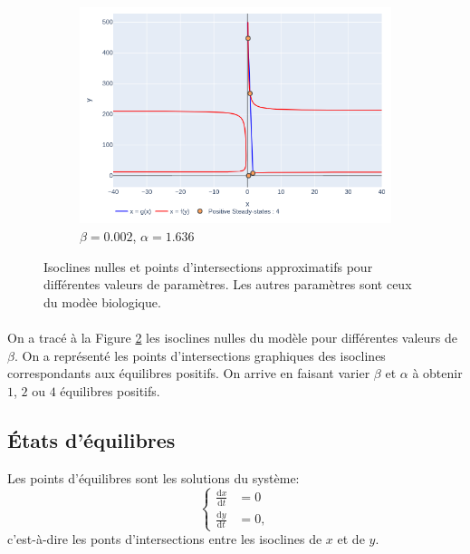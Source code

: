\documentclass[12pt]{article}
\newcommand{\deriv}{\mathrm{d}}
\newcommand{\dt}[1]{\frac{\deriv #1}{\deriv t}}
\begin{document}
\begin{figure}[!ht]
\begin{subfigure}[b]{0.49\textwidth}
         \includegraphics[width=\textwidth]{figures/fig_isocline_0.png}
         \caption{$\beta = 0.002$, $\alpha=1.636$}
         \label{fig::nuclline 4 ss}
     \end{subfigure}
    \caption{Isoclines nulles et points d'intersections approximatifs pour différentes valeurs de paramètres. Les autres paramètres sont ceux du modèe biologique.}
    \label{fig:nullclines}
\end{figure}

\paragraph{}
On a tracé à la Figure \ref{fig:nullclines} les isoclines nulles du modèle pour différentes valeurs de $\beta$. On a représenté les points d'intersections graphiques des isoclines correspondants aux équilibres positifs. On arrive en faisant varier $\beta$ et $\alpha$ à obtenir $1$, $2$ ou $4$ équilibres positifs. 

\subsection{États d'équilibres}
Les points d'équilibres sont les solutions du système: 
\begin{equation*}
    \left\{
    \begin{aligned}
        \dt{x} &= 0\\
        \dt{y} &= 0,
    \end{aligned}\right.
\end{equation*}
c'est-à-dire les ponts d'intersections entre les isoclines de $x$ et de $y$. 
\end{document}
